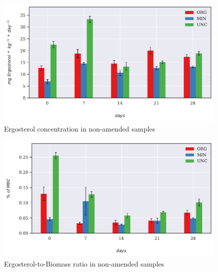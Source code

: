 \documentclass[12pt]{report}
\begin{document}
		\begin{figure}[H]
			\centering
			\includegraphics[scale=0.8]{thesis_figures/main_incubation/control/Erg.pdf}
			\caption{Ergosterol concentration in non-amended samples}
			\label{fig:erg_control_main}
		\end{figure}
		
		
		\begin{figure}[H]
				\centering
				\includegraphics[scale=0.8]{thesis_figures/main_incubation/control/Erg-to-MBC.pdf}
				\caption{Ergosterol-to-Biomass ratio in non-amended samples}
				\label{fig:erg_to_biomass_control_main}
		\end{figure}
\end{document}
